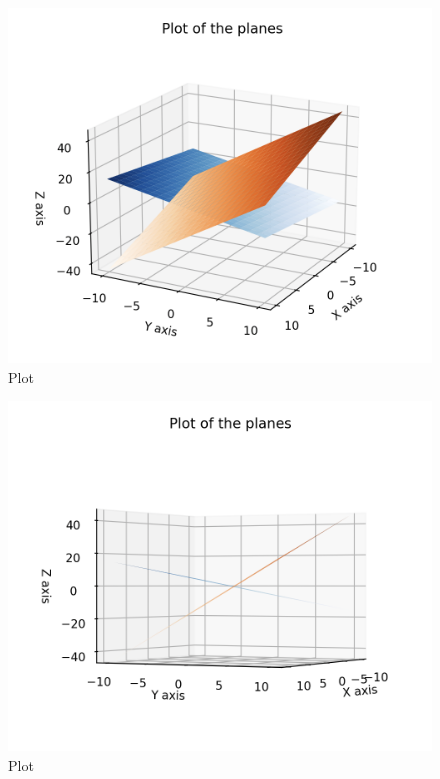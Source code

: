 \documentclass[12pt]{article}
\begin{document}
\begin{figure}[H]
    \centering
    \includegraphics[width=0.7\columnwidth]{Figs/Figure_3.2.png}
    \caption{Plot}
    \label{fig:placeholder}
\end{figure}

\begin{figure}[H]
    \centering
    \includegraphics[width=0.9\columnwidth]{Figs/Figure_3.1.png}
    \caption{Plot}
    \label{fig:placeholder}
\end{figure}
\end{document}
